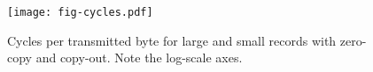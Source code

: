 \begin{figure}[t]
\texttt{[image: fig-cycles.pdf]}
\caption{Cycles per transmitted byte for large and small records with zero-copy and copy-out. Note the log-scale axes.}
\label{fig:cycles}
\end{figure}
